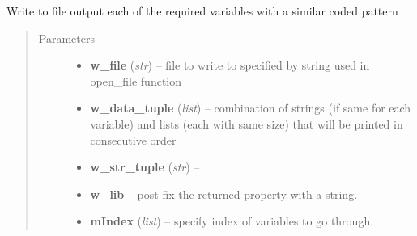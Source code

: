 \documentclass[letterpaper,10pt,english]{sphinxmanual}
\begin{document}
\begin{fulllineitems}
\begin{fulllineitems}
\label{eqparse:eqparse.baseparse.BaseParse.pattern_change}
\end{fulllineitems}


\begin{fulllineitems}
\label{eqparse:eqparse.baseparse.BaseParse.pattern_write}
Write to file output each of the required variables with a similar coded pattern
\begin{quote}\begin{description}
\item[{Parameters}] \leavevmode\begin{itemize}
\item {} 
\textbf{w\_file} (\emph{str}) -- file to write to specified by string used in open\_file function

\item {} 
\textbf{w\_data\_tuple} (\emph{list}) -- combination of strings (if same for each variable) and lists (each with same size) that will be printed in consecutive order

\item {} 
\textbf{w\_str\_tuple} (\emph{str}) -- 

\item {} 
\textbf{w\_lib} -- post-fix the returned property with a string.

\item {} 
\textbf{mIndex} (\emph{list}) -- specify index of variables to go through.

\end{itemize}

\end{description}\end{quote}

\end{fulllineitems}


\begin{fulllineitems}
\label{eqparse:eqparse.baseparse.BaseParse.rasterise_dict_modifiers}
\end{fulllineitems}


\end{fulllineitems}
\end{document}
